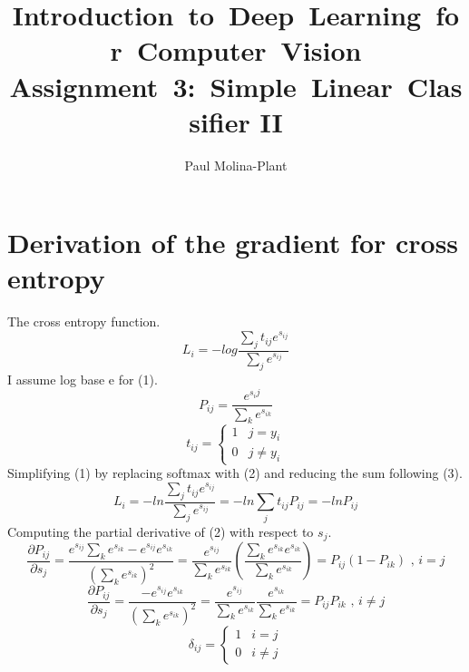 \documentclass[12pt, letter]{article}
\newcommand{\courseName}{Introduction~to~Deep~Learning~for~Computer~Vision}
\newcommand{\assignName}{Assignment~3:~Simple~Linear~Classifier II}
\begin{document}
\pagestyle{titlesec_assignment}

\title{\courseName\\\assignName}
\author{Paul Molina-Plant}
\maketitle


\pagebreak

\section{Derivation of the gradient for cross entropy}
The cross entropy function.
\begin{equation}
  L_{i} = - log \frac{\sum_{j}t_{ij}e^{s_{ij}}}{\sum_{j}e^{s_{ij}}}
\end{equation}
I assume log base e for (1).
\begin{equation}
  P_{ij} = \frac{e^{s_ij}}{\sum_{k}e^{s_{ik}}}
\end{equation}
\begin{equation}
  t_{ij} =
  \begin{cases}
    1 & j = y_{i} \\
    0 & j \ne y_{i}
  \end{cases}
\end{equation}
Simplifying (1) by replacing softmax with (2) and reducing the sum following (3).
\begin{equation}
  L_{i} = - ln \frac{\sum_{j}t_{ij}e^{s_{ij}}}{\sum_{j}e^{s_{ij}}} = - ln \sum_{j}t_{ij}P_{ij} = - ln P_{ij}
\end{equation}
Computing the partial derivative of (2) with respect to $s_{j}$.
\begin{equation}
  \frac{\partial P_{ij}}{\partial s_{j}} = \frac{e^{s_{ij}} \sum_{k}e^{s_{ik}} - e^{s_{ij}}e^{s_{ik}}}{(\sum_{k}e^{s_{ik}})^2} = \frac{e^{s_{ij}}}{\sum_ke^{s_{ik}}} (\frac{\sum_ke^{s_{ik}}e^{s_{ik}}}{\sum_ke^{s_{ik}}}) = P_{ij} (1  - P_{ik})\text{ , $i = j$}
\end{equation}
\begin{equation}
  \frac{\partial P_{ij}}{\partial s_{j}} = \frac{- e^{s_{ij}}e^{s_{ik}}}{(\sum_{k}e^{s_{ik}})^2} = \frac{e^{s_{ij}}}{\sum_ke^{s_{ik}}} \frac{e^{s_{ik}}}{\sum_ke^{s_{ik}}} = P_{ij}P_{ik}\text{ , $i \ne j$}
\end{equation}
\begin{equation}
  \delta_{ij} =
  \begin{cases}
    1 & i = j \\
    0 & i \ne j
  \end{cases}
\end{equation}
\end{document}
